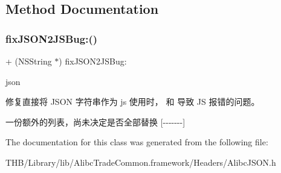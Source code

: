 \subsection{Method Documentation}
\mbox{\label{interface_alibc_j_s_o_n_a8d8597e7758b604b034919211f251a52}} 
\subsubsection{\texorpdfstring{fix\+J\+S\+O\+N2\+J\+S\+Bug\+:()}{fixJSON2JSBug:()}}
{\footnotesize\ttfamily + (N\+S\+String $\ast$) fix\+J\+S\+O\+N2\+J\+S\+Bug\+: \begin{DoxyParamCaption}\item[{(N\+S\+String $\ast$)}]{json }\end{DoxyParamCaption}}

修复直接将 J\+S\+ON 字符串作为 js 使用时， 和  导致 JS 报错的问题。

一份额外的列表，尚未决定是否全部替换 \mbox{[}-\/-\/-\/-\/-\/-\/-\/\mbox{]} 

The documentation for this class was generated from the following file\+:\begin{DoxyCompactItemize}
\item 
T\+H\+B/\+Library/lib/\+Alibc\+Trade\+Common.\+framework/\+Headers/Alibc\+J\+S\+O\+N.\+h\end{DoxyCompactItemize}
